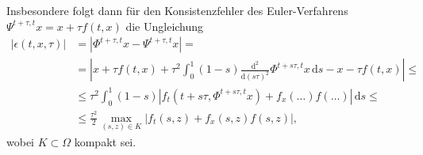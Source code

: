 \documentclass[english, parskip=full]{scrartcl}
\newcommand{\intx}{}
\newcommand{\kla}{}
\newcommand{\tecxt}{}
\begin{document}
Insbesondere folgt dann für den Konsistenzfehler des Euler-Verfahrens $\Psi^{t+\tau,t}x = x + \tau f(t,x)$ die Ungleichung
\begin{align}
|\epsilon(t,x,\tau)| &= \left\vert \Phi^{t+\tau,t} x - \Psi^{t+\tau,t}x \right\vert = \\
&= \left\vert x + \tau f(t,x) + \tau^2 \intx\int_{0}^{1}(1-s) \frac{\tecxt\text{d}^2}{\tecxt\text{d}(s\tau)^2}\Phi^{t+ s\tau,t} x  \, \mathrm{d}s - x - \tau f(t,x) \right\vert \le \\
&\le \tau^2 \intx\int_{0}^{1}(1-s) \left\vert f_t \kla\left( t+s\tau, \Phi^{t+s\tau,t} x \right) + f_x(\dots) f(\dots) \right\vert \, \mathrm{d}s \le \\
&\le \frac{\tau^2}{2} \max_{(s,z)\in K} \left\vert f_t(s,z) + f_x(s,z)f(s,z) \right\vert,
\end{align}
wobei $K\subset\Omega$ kompakt sei.
\end{document}
